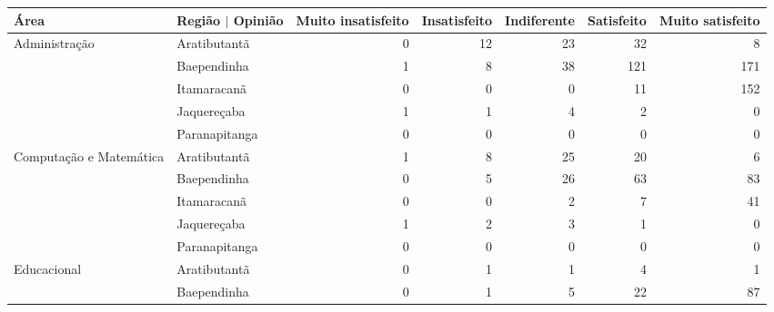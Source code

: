 \begin{table}[ht]
\centering
\begin{tabular}{ll rrrrr}
  \toprule
 Área                    & Região $\vert$ Opinião & \multicolumn{1}{l}{ Muito insatisfeito} & \multicolumn{1}{l}{ Insatisfeito} & \multicolumn{1}{l}{ Indiferente} & \multicolumn{1}{l}{ Satisfeito} & \multicolumn{1}{l}{ Muito satisfeito} \\ 
   \midrule
Administração           & Aratibutantã            &                  0 &           12 &          23 &         32 &                8 \\ 
                          & Baependinha             &                  1 &            8 &          38 &        121 &              171 \\ 
                          & Itamaracanã             &                  0 &            0 &           0 &         11 &              152 \\ 
                          & Jaquereçaba             &                  1 &            1 &           4 &          2 &                0 \\ 
                          & Paranapitanga           &                  0 &            0 &           0 &          0 &                0 \\ 
\midrule
 Computação e Matemática & Aratibutantã            &                  1 &            8 &          25 &         20 &                6 \\ 
                          & Baependinha             &                  0 &            5 &          26 &         63 &               83 \\ 
                          & Itamaracanã             &                  0 &            0 &           2 &          7 &               41 \\ 
                          & Jaquereçaba             &                  1 &            2 &           3 &          1 &                0 \\ 
                          & Paranapitanga           &                  0 &            0 &           0 &          0 &                0 \\ 
\midrule
 Educacional             & Aratibutantã            &                  0 &            1 &           1 &          4 &                1 \\ 
                          & Baependinha             &                  0 &            1 &           5 &         22 &               87 \\ 

\end{tabular}
\end{table}
